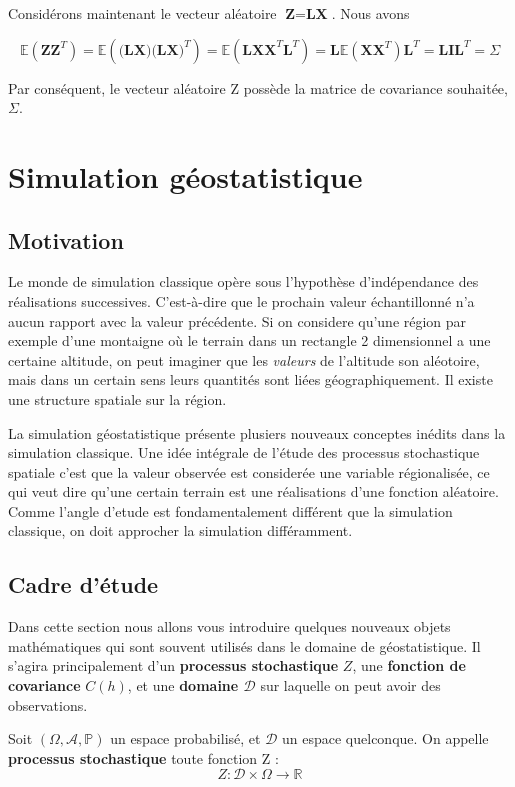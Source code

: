 \documentclass[10pt]{article} %
\begin{document}
Considérons maintenant le vecteur aléatoire $\textbf{Z} = \textbf{LX}$. Nous avons

 $$ \mathbb{E}(\textbf{ZZ}^T) = \mathbb{E}(\textbf{(LX)(LX)}^T) = \mathbb{E}(\textbf{LXX}^{T}\textbf{L}^{T}) =
 \textbf{L}\mathbb{E}(\textbf{XX}^{T})\textbf{L}^{T} = \textbf{LIL}^{T} = \Sigma $$

Par conséquent, le vecteur aléatoire Z possède la matrice de covariance souhaitée, $ \Sigma $.


\section{Simulation géostatistique}

\subsection{Motivation}

Le monde de simulation classique opère sous l'hypothèse d'indépendance des réalisations successives. C'est-à-dire que le prochain
valeur échantillonné n'a aucun rapport avec la valeur précédente. Si on considere qu'une région par exemple d'une montaigne où le terrain
dans un rectangle 2 dimensionnel a une certaine altitude, on peut imaginer que les \textit{valeurs} de l'altitude son aléotoire, mais dans un
certain sens leurs quantités sont liées géographiquement. Il existe une structure spatiale sur la région.

La simulation géostatistique présente plusiers nouveaux conceptes inédits dans la simulation classique. Une idée intégrale de l'étude des processus
stochastique spatiale c'est que la valeur observée est considerée une variable régionalisée, ce qui veut dire qu'une certain terrain
est une réalisations d'une fonction aléatoire. Comme l'angle d'etude est fondamentalement différent que la simulation classique, on doit approcher la simulation
différamment.

\subsection{Cadre d'étude}
Dans cette section nous allons vous introduire quelques nouveaux objets mathématiques qui sont souvent utilisés dans le domaine
de géostatistique. Il s'agira principalement d'un \textbf{processus stochastique} $Z$, une \textbf{fonction de covariance} $C(h)$, et une \textbf{domaine $\mathcal{D}$} sur laquelle
on peut avoir des observations.

\begin{definition}
    Soit $(\Omega, \mathcal{A}, \mathbb{P})$ un espace probabilisé, et $\mathcal{D}$ un espace quelconque. On appelle
    \textbf{processus stochastique} toute fonction Z :
    $$ Z : \mathcal{D} \times \Omega \to \mathbb{R} $$
\end{definition}
\end{document}
